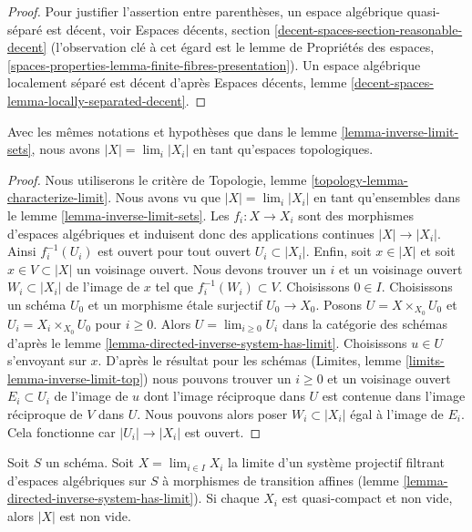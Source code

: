 \begin{proof}
\medskip\noindent
Pour justifier l'assertion entre parenthèses, un espace algébrique quasi-séparé est décent, voir
Espaces décents, section \ref{decent-spaces-section-reasonable-decent}
(l'observation clé à cet égard est le lemme de Propriétés des espaces,
\ref{spaces-properties-lemma-finite-fibres-presentation}).
Un espace algébrique localement séparé est décent d'après
Espaces décents, lemme \ref{decent-spaces-lemma-locally-separated-decent}.
\end{proof}

\begin{lemma}
\label{lemma-topology-limit}
Avec les mêmes notations et hypothèses que dans le lemme \ref{lemma-inverse-limit-sets},
nous avons $|X| = \lim_i |X_i|$ en tant qu'espaces topologiques.
\end{lemma}

\begin{proof}
Nous utiliserons le critère de
Topologie, lemme \ref{topology-lemma-characterize-limit}.
Nous avons vu que $|X| = \lim_i |X_i|$ en tant qu'ensembles dans
le lemme \ref{lemma-inverse-limit-sets}.
Les $f_i : X \to X_i$ sont des morphismes d'espaces algébriques
et induisent donc des applications continues $|X| \to |X_i|$.
Ainsi $f_i^{-1}(U_i)$ est ouvert pour tout
ouvert $U_i \subset |X_i|$. Enfin,
soit $x \in |X|$ et soit $x \in V \subset |X|$ un voisinage ouvert.
Nous devons trouver un $i$ et un voisinage ouvert
$W_i \subset |X_i|$ de l'image de $x$
tel que $f_i^{-1}(W_i) \subset V$.
Choisissons $0 \in I$. Choisissons un schéma $U_0$ et un morphisme
\'etale surjectif $U_0 \to X_0$. Posons $U = X \times_{X_0} U_0$
et $U_i = X_i \times_{X_0} U_0$ pour $i \geq 0$.
Alors $U = \lim_{i \geq 0} U_i$ dans la catégorie des schémas d'après
le lemme \ref{lemma-directed-inverse-system-has-limit}.
Choisissons $u \in U$ s'envoyant sur $x$. D'après le résultat pour les schémas
(Limites, lemme \ref{limits-lemma-inverse-limit-top})
nous pouvons trouver un $i \geq 0$ et un voisinage ouvert
$E_i \subset U_i$ de l'image de $u$
dont l'image réciproque dans $U$ est contenue dans
l'image réciproque de $V$ dans $U$. Nous pouvons alors poser $W_i \subset |X_i|$
égal à l'image de $E_i$. Cela fonctionne car $|U_i| \to |X_i|$ est ouvert.
\end{proof}

\begin{lemma}
\label{lemma-limit-nonempty}
Soit $S$ un schéma. Soit $X = \lim_{i \in I} X_i$ la limite d'un système
projectif filtrant d'espaces algébriques sur $S$ à morphismes de transition affines
(lemme \ref{lemma-directed-inverse-system-has-limit}). Si chaque $X_i$
est quasi-compact et non vide, alors $|X|$ est non vide.
\end{lemma}

